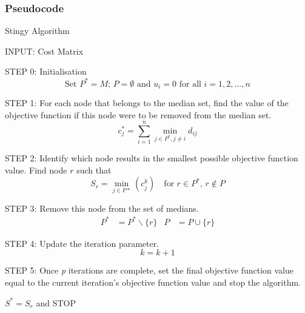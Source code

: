 \documentclass[11pt]{article}
\begin{document}
	\subsubsection{Pseudocode}
	\begin{algorithm}
		\caption{Stingy Algorithm}
		\begin{algorithmic}[0]
			
			
			\Statex 
			\Statex INPUT: Cost Matrix
			
			
			\Statex 
			\Statex STEP 0: Initialisation 	
			\begin{equation*}
			\text{Set } P^*=M \text{; } P=\emptyset \text{ and } u_i=0 \text{ for all } i=1,2,\dots,n
			\end{equation*}
			
			\Statex 
			\Statex STEP 1: For each node that belongs to the median set, find the value of the objective function if this node were to be removed from the median set.
			\begin{equation*}
			c_j^* = \sum_{i=1}^{n} \min_{j\in P^*, j\neq i} d_{ij}
			\end{equation*}
			
			\Statex 
			\Statex STEP 2: Identify which node results in the smallest possible objective function value.
			\Statex Find node $r$ such that 
			\begin{equation*}
			S_r = \min_{j \in P*}(c_j^k) \quad \text{for } r \in P^* \text{, } r \notin P
			\end{equation*}
			
			
			\Statex 
			\Statex STEP 3: Remove this node from the set of medians.
			\begin{align*}
			P^* &= P^* \backslash \{r\} & P &= P \cup \{r\}
			\end{align*}
			
			\Statex 
			\Statex STEP 4: Update the iteration parameter.
			\begin{equation*}
			k = k+1
			\end{equation*}
			
			
			\Statex 
			\Statex STEP 5: Once \emph{p} iterations are complete, set the final objective function value equal to the current iteration's objective function value and stop the algorithm.
			\begin{center}
				$S^{*} = S_r$ and STOP
			\end{center}
			
			
		\end{algorithmic}
	\end{algorithm}
	
\end{document}

